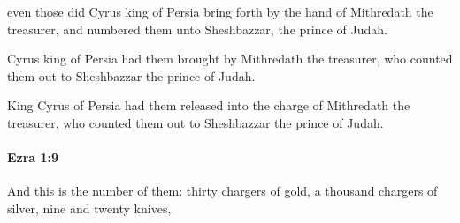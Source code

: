 			\begin{versebox}
					\item[BHS] 
					\item[LXX] 
					\item[ASV] even those did Cyrus king of Persia bring forth by the hand of Mithredath the treasurer, and numbered them unto Sheshbazzar, the prince of Judah.
					\item[NIV] Cyrus king of Persia had them brought by Mithredath the treasurer, who counted them out to Sheshbazzar the prince of Judah.
					\item[NRSV] King Cyrus of Persia had them released into the charge of Mithredath the treasurer, who counted them out to Sheshbazzar the prince of Judah.
			\end{versebox}

		\paragraph{Ezra 1:9} %
			\label{EZRA-1-9}

			And this is the number of them: thirty chargers of gold, a thousand chargers of silver, nine and twenty knives,

